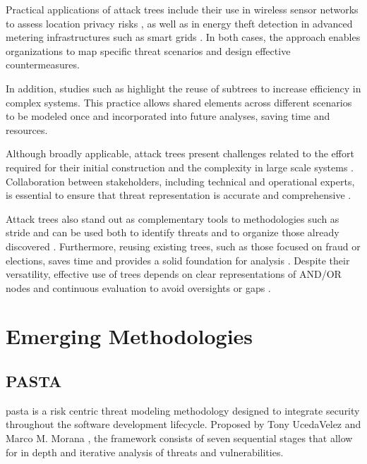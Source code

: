 Practical applications of attack trees include their use in wireless sensor
networks to assess location privacy risks \cite{AnAttackTreeBasedRisk}, as well
as in energy theft detection in advanced metering infrastructures such as smart
grids \cite{Energytheftdetectionissues}. In both cases, the approach enables
organizations to map specific threat scenarios and design effective
countermeasures.

In addition, studies such as \cite{FoundationsofAttackTrees} highlight the reuse
of subtrees to increase efficiency in complex systems. This practice allows
shared elements across different scenarios to be modeled once and incorporated
into future analyses, saving time and resources.

Although broadly applicable, attack trees present challenges related to the
effort required for their initial construction and the complexity in large scale
systems \cite{AttackTrees, Energytheftdetectionissues}. Collaboration between
stakeholders, including technical and operational experts, is essential to
ensure that threat representation is accurate and comprehensive
\cite{Energytheftdetectionissues}.

Attack trees also stand out as complementary tools to methodologies such as
\gls{stride} and can be used both to identify threats and to organize those
already discovered \cite{FoundationsofAttackTrees,
ThreatModelingASystematicLiteratureReview}. Furthermore, reusing existing trees,
such as those focused on fraud or elections, saves time and provides a solid
foundation for analysis \cite{FoundationsofAttackTrees}. Despite their
versatility, effective use of trees depends on clear representations of AND/OR
nodes and continuous evaluation to avoid oversights or gaps
\cite{ThreatModelingdesigningForSecurity}.

\section{Emerging Methodologies}
\label{sec:emerging_methodologies}

\subsection{PASTA}
\label{subsec:pasta}

\gls{pasta} is a risk centric threat modeling methodology designed to integrate
security throughout the software development lifecycle. Proposed by Tony
UcedaVelez and Marco M. Morana \cite{RiskCentricThreatModeling}, the framework
consists of seven sequential stages that allow for in depth and iterative
analysis of threats and vulnerabilities.

